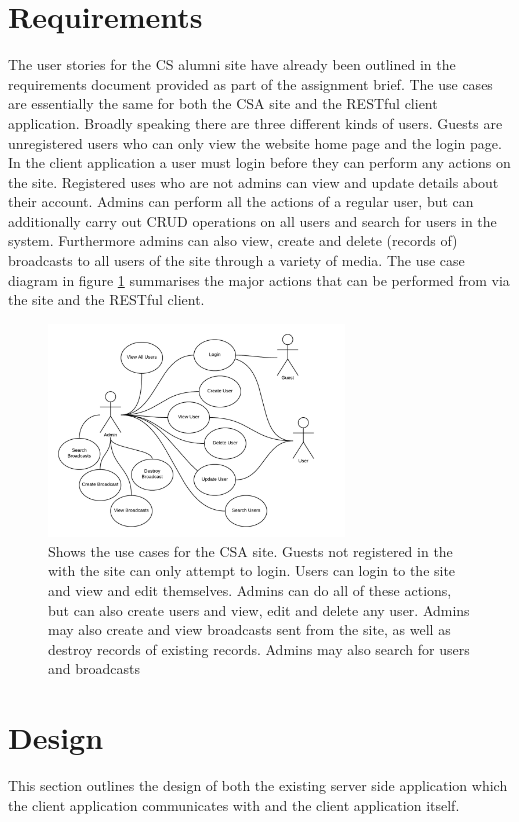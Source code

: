 \documentclass[paper=a4, fontsize=11pt]{scrartcl}	%
\numberwithin{equation}{section}															%
\numberwithin{figure}{section}																%
\numberwithin{table}{section}
\begin{document}
\section{Requirements}
\label{sec:requirements}
The user stories for the CS alumni site have already been outlined in the requirements document provided as part of the assignment brief. The use cases are essentially the same for both the CSA site and the RESTful client application. Broadly speaking there are three different kinds of users. Guests are unregistered users who can only view the website home page and the login page. In the client application a user must login before they can perform any actions on the site. Registered uses who are not admins can view and update details about their account. Admins can perform all the actions of a regular user, but can additionally carry out CRUD operations on all users and search for users in the system. Furthermore admins can also view, create and delete (records of) broadcasts to all users of the site through a variety of media. The use case diagram in figure \ref{fig:use-cases} summarises the major actions that can be performed from via the site and the RESTful client.

\begin{figure}[H]
\centering
\includegraphics[width=0.7\textwidth]{img/use_cases.png}
\caption{Shows the use cases for the CSA site. Guests not registered in the with the site can only attempt to login. Users can login to the site and view and edit themselves. Admins can do all of these actions, but can also create users and view, edit and delete any user. Admins may also create and view broadcasts sent from the site, as well as destroy records of existing records. Admins may also search for users and broadcasts}
\label{fig:use-cases}
\end{figure}

\section{Design}
\label{sec:design}
This section outlines the design of both the existing server side application which the client application communicates with and the client application itself.
\end{document}
